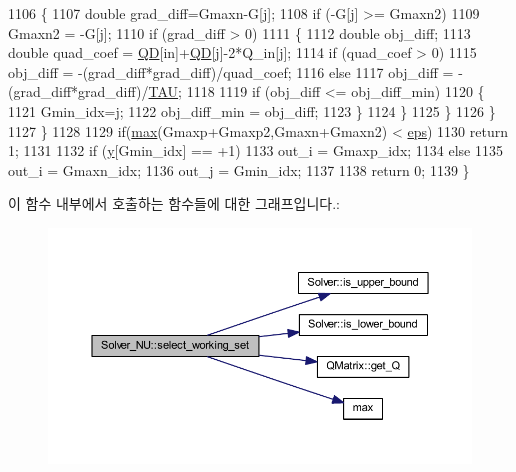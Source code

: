\begin{DoxyCode}
1106             \{
1107                 \textcolor{keywordtype}{double} grad\_diff=Gmaxn-G[j];
1108                 \textcolor{keywordflow}{if} (-G[j] >= Gmaxn2)
1109                     Gmaxn2 = -G[j];
1110                 \textcolor{keywordflow}{if} (grad\_diff > 0)
1111                 \{
1112                     \textcolor{keywordtype}{double} obj\_diff;
1113                     \textcolor{keywordtype}{double} quad\_coef = \hyperlink{class_solver_a7c7b7b1207983543855165e8eb249f2a}{QD}[in]+\hyperlink{class_solver_a7c7b7b1207983543855165e8eb249f2a}{QD}[j]-2*Q\_in[j];
1114                     \textcolor{keywordflow}{if} (quad\_coef > 0)
1115                         obj\_diff = -(grad\_diff*grad\_diff)/quad\_coef;
1116                     \textcolor{keywordflow}{else}
1117                         obj\_diff = -(grad\_diff*grad\_diff)/\hyperlink{svm_8cpp_a3d8c9c145887af5174ba4cc6789862ad}{TAU};
1118 
1119                     \textcolor{keywordflow}{if} (obj\_diff <= obj\_diff\_min)
1120                     \{
1121                         Gmin\_idx=j;
1122                         obj\_diff\_min = obj\_diff;
1123                     \}
1124                 \}
1125             \}
1126         \}
1127     \}
1128 
1129     \textcolor{keywordflow}{if}(\hyperlink{svm_8cpp_a7cba98555a7346b01e4cc06205527d8a}{max}(Gmaxp+Gmaxp2,Gmaxn+Gmaxn2) < \hyperlink{class_solver_a718333cc2c1d40abf9c292a788cba1e5}{eps})
1130         \textcolor{keywordflow}{return} 1;
1131 
1132     \textcolor{keywordflow}{if} (\hyperlink{class_solver_a3acc1043d06dedf87f054ff3eea5c426}{y}[Gmin\_idx] == +1)
1133         out\_i = Gmaxp\_idx;
1134     \textcolor{keywordflow}{else}
1135         out\_i = Gmaxn\_idx;
1136     out\_j = Gmin\_idx;
1137 
1138     \textcolor{keywordflow}{return} 0;
1139 \}
\end{DoxyCode}


이 함수 내부에서 호출하는 함수들에 대한 그래프입니다.\+:
\nopagebreak
\begin{figure}[H]
\begin{center}
\leavevmode
\includegraphics[width=350pt]{class_solver___n_u_a39577d8d09b1d04500c41a999dfd21e9_cgraph}
\end{center}
\end{figure}


